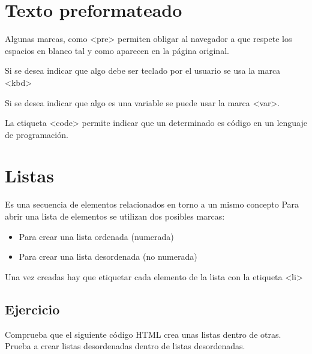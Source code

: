 \documentclass[letterpaper,10pt,spanish]{sphinxmanual}
\begin{document}
\section{Texto preformateado}
\label{tema2:texto-preformateado}
Algunas marcas, como \textless{}pre\textgreater{} permiten obligar al navegador a que respete los espacios en blanco tal y como aparecen en la página original.

Si se desea indicar que algo debe ser teclado por el usuario se usa la marca \textless{}kbd\textgreater{}

Si se desea indicar que algo es una variable se puede usar la marca \textless{}var\textgreater{}.

La etiqueta \textless{}code\textgreater{} permite indicar que un determinado es código en un lenguaje de programación.


\section{Listas}
\label{tema2:listas}
Es una secuencia de elementos relacionados en torno a un mismo concepto Para abrir una lista de elementos se utilizan dos posibles marcas:
\begin{itemize}
\item {} 
 Para crear una lista ordenada (numerada)

\item {} 
 Para crear una lista desordenada (no numerada)

\end{itemize}

Una vez creadas hay que etiquetar cada elemento de la lista con la etiqueta \textless{}li\textgreater{}


\subsection{Ejercicio}
\label{tema2:ejercicio}
Comprueba que el siguiente código HTML crea unas listas dentro de otras. Prueba a crear listas desordenadas dentro de listas desordenadas.
\end{document}

